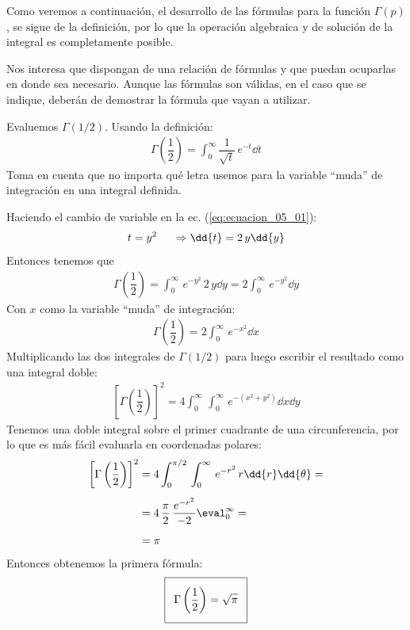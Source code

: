 Como veremos a continuación, el desarrollo de las fórmulas para la función $\Gamma (p)$, se sigue de la definición, por lo que la operación algebraica y de solución de la integral es completamente posible.
\par
Nos interesa que dispongan de una relación de fórmulas y que puedan ocuparlas en donde sea necesario. Aunque las fórmulas son válidas, en el caso que se indique, deberán de demostrar la fórmula que vayan a utilizar.
\par 
Evaluemos $\Gamma (1/2)$. Usando la definición:
\begin{align}
\Gamma \left( \dfrac{1}{2}\right) = \int_{0}^{\infty} \dfrac{1}{\sqrt{t}} \, e^{-t} \dd{t}
\label{eq:ecuacion_05_01}
\end{align}
Toma en cuenta que no importa qué letra usemos para la variable \enquote{muda} de integración en una integral definida.
\par
Haciendo el cambio de variable en la ec. (\ref{eq:ecuacion_05_01}):
\begin{align*}
t = y^{2} \hspace{0.5cm} \Rightarrow \dd{t} = 2 \, y \dd{y}
\end{align*}
Entonces tenemos que
\begin{align*}
\Gamma \left( \dfrac{1}{2} \right) = \int_{0}^{\infty} \, e^{-y^{2}} \, 2 \, y \dd{y} = 2 \int_{0}^{\infty} \, e^{-y^{2}} \dd{y}
\end{align*}
Con $x$ como la variable \enquote{muda} de integración:
\begin{align}
\Gamma \left( \dfrac{1}{2} \right) = 2 \int_{0}^{\infty} \, e^{-x^{2}} \dd{x}
\label{eq:ecuacion_05_02}
\end{align}
Multiplicando las dos integrales de $\Gamma (1/2)$ para luego escribir el resultado como una integral doble:
\begin{align*}
\left[ \Gamma \left( \dfrac{1}{2} \right) \right]^{2} = 4 \int_{0}^{\infty} \, \int_{0}^{\infty} \, e^{-(x^{2} + y^{2})} \dd{x} \dd{y}
\end{align*}
Tenemos una doble integral sobre el primer cuadrante de una circunferencia, por lo que es más fácil evaluarla en coordenadas polares:
\begin{align*}
\left[ \Gamma \left( \dfrac{1}{2} \right) \right]^{2} &= 4 \int_{0}^{\pi/2} \, \int_{0}^{\infty} \, e^{-r^{2}} \, r \dd{r} \dd{\theta} = \\[0.5em]
&= 4 \, \dfrac{\pi}{2} \, \dfrac{e^{-r^{2}}}{-2}\eval_{0}^{\infty} = \\[0.5em]
&= \pi
\end{align*}
Entonces obtenemos la primera fórmula:
\begin{align}\addtolength{\fboxsep}{5pt}\boxed{
\Gamma \left( \dfrac{1}{2} \right) = \sqrt{\pi}}
\label{eq:ecuacion_05_03}
\end{align}

